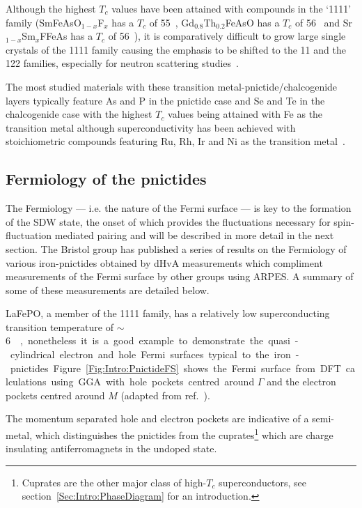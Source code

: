 Although the highest $T_c$ values have been attained with compounds in the `1111' family (SmFeAsO$_{1-x}$F$_x$ has a $T_c$ of \unit{55}{\kelvin}~\cite{Ren2008}, Gd$_0.8$Th$_{0.2}$FeAsO has a $T_c$ of \unit{56}{\kelvin}~\cite{Wang2008} and Sr$_{1-x}$Sm$_x$FFeAs has a $T_c$ of \unit{56}{\kelvin}~\cite{Wu2009}), it is comparatively difficult to grow large single crystals of the 1111 family causing the emphasis to be shifted to the 11 and the 122 families, especially for neutron scattering studies~\cite{Johnston2010}.

The most studied materials with these transition metal-pnictide/chalcogenide layers typically feature As and P in the pnictide case and Se and Te in the chalcogenide case with the highest $T_c$ values being attained with Fe as the transition metal although superconductivity has been achieved with stoichiometric compounds featuring Ru, Rh, Ir and Ni as the transition metal~\cite{Johnston2010}.



\subsection{Fermiology of the pnictides}

The Fermiology --- i.e. the nature of the Fermi surface --- is key to the formation of the \ac{SDW} state, the onset of which provides the fluctuations necessary for spin-fluctuation mediated pairing and will be described in more detail in the next section. The Bristol group has published a series of results on the Fermiology of various iron-pnictides obtained by \acf{dHvA} measurements which compliment measurements of the Fermi surface by other groups using \acf{ARPES}. A summary of some of these measurements are detailed below.

LaFePO, a member of the 1111 family, has a relatively low superconducting transition temperature of \unit{$\sim$6}{\kelvin}, nonetheless it is a good example to demonstrate the quasi-cylindrical electron and hole Fermi surfaces typical to the iron-pnictides. Figure~\ref{Fig:Intro:PnictideFS} shows the Fermi surface from \acf{DFT} calculations using \ac{GGA} with hole pockets centred around $\Gamma$ and the electron pockets centred around $M$ (adapted from ref.~\cite{Carrington2009}).

The momentum separated hole and electron pockets are indicative of a semi-metal, which distinguishes the pnictides from the cuprates\footnote{Cuprates are the other major class of high-$T_c$ superconductors, see section~\ref{Sec:Intro:PhaseDiagram} for an introduction.} which are charge insulating antiferromagnets in the undoped state. 


